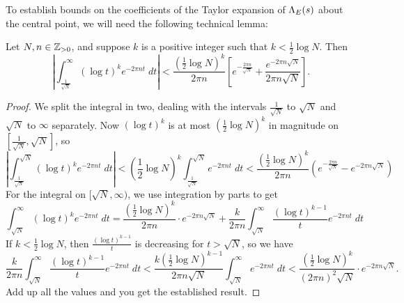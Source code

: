 To establish bounds on the coefficients of the Taylor expansion of $\Lambda_E(s)$ about the central point, we will need the following technical lemma:
\begin{lemma}\label{lem:central_deriv_int_bounds}
Let $N,n \in \mathbb{Z}_{>0}$, and suppose $k$ is a positive integer such that $k < \frac{1}{2}\log N$. Then
\begin{equation}
\left| \int_{\frac{1}{\sqrt{N}}}^{\infty} (\log t)^{k} e^{-2\pi n t} \; dt \right| < \frac{\left(\frac{1}{2} \log N\right)^{k}}{2\pi n}\left[ e^{-\frac{2\pi n}{\sqrt{N}}} + \frac{e^{-2\pi n\sqrt{N}}}{2\pi n \sqrt N} \right].
\end{equation}
\end{lemma}
\begin{proof}
We split the integral in two, dealing with the intervals $\frac{1}{\sqrt{N}}$ to $\sqrt{N}$ and $\sqrt{N}$ to $\infty$ separately. Now $(\log t)^{k}$ is at most $(\frac{1}{2}\log N)^k$ in magnitude on $[\frac{1}{\sqrt{N}},\sqrt{N}]$, so
\begin{equation*}
\left| \int_{\frac{1}{\sqrt{N}}}^{\sqrt{N}} (\log t)^{k} e^{-2\pi n t} \; dt \right| < \left(\frac{1}{2} \log N\right)^k \int_{\frac{1}{\sqrt{N}}}^{\sqrt{N}} e^{-2\pi n t} \; dt < \frac{\left(\frac{1}{2} \log N\right)^{k}}{2\pi n}\left(e^{-\frac{2\pi n}{\sqrt{N}}} - e^{-2\pi n\sqrt{N}}\right)
\end{equation*}
For the integral on $[\sqrt{N},\infty)$, we use integration by parts to get
\begin{equation*}
\int_{\sqrt{N}}^{\infty} \left(\log t \right)^{k} e^{-2\pi n t} \; dt = \frac{\left(\frac{1}{2} \log N\right)^{k}}{2\pi n}\cdot e^{-2\pi n\sqrt{N}} + \frac{k}{2\pi n} \int_{\sqrt{N}}^{\infty} \frac{\left(\log t \right)^{k-1}}{t} e^{-2\pi n t} \; dt 
\end{equation*}
If $k < \frac{1}{2}\log N$, then $\frac{\left(\log t \right)^{k-1}}{t}$ is decreasing for $t > \sqrt{N}$, so we have
\begin{equation*}
\frac{k}{2\pi n} \int_{\sqrt{N}}^{\infty} \frac{\left(\log t \right)^{k-1}}{t} e^{-2\pi n t} \; dt < \frac{k\left(\frac{1}{2} \log N\right)^{k-1}}{2\pi n\sqrt{N}} \int_{\sqrt{N}}^{\infty} e^{-2\pi n t} \; dt < \frac{\left(\frac{1}{2} \log N\right)^{k}}{(2\pi n)^2 \sqrt{N}} \cdot e^{-2\pi n \sqrt{N}}.
\end{equation*}
Add up all the values and you get the established result.
\end{proof}

